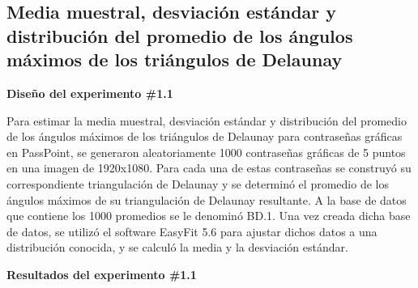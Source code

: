 \documentclass[12pt]{report}
\begin{document}
\subsection{Media muestral, desviación estándar y distribución del promedio de los ángulos máximos de los triángulos de Delaunay }
\label{sec:1.1}

	\textbf{Diseño del experimento \#1.1}
	
	 Para estimar la media muestral, desviación estándar y distribución del promedio de los ángulos máximos de los triángulos de Delaunay para contraseñas gráficas en PassPoint, se generaron aleatoriamente 1000 contraseñas gráficas de 5 puntos en una imagen de 1920x1080. Para cada una de estas contraseñas se  construyó  su correspondiente triangulación  de Delaunay  y se  determinó el promedio  de los ángulos máximos de su triangulación de Delaunay resultante. A la base de datos que contiene los 1000 promedios se le denominó BD.1. Una vez creada dicha base de datos, se utilizó el software EasyFit 5.6 para ajustar dichos datos a una distribución conocida, y se calculó la media y la desviación estándar.
	 
	 \textbf{Resultados del experimento \#1.1}
	 
\end{document}
